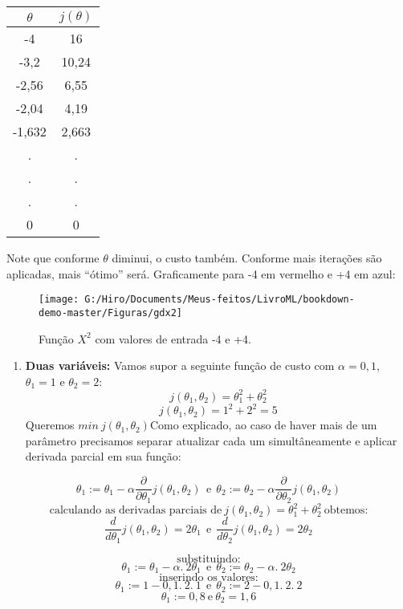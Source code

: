 \documentclass[
  openany]{book}
\providecommand{\tightlist}{%
  \setlength{\itemsep}{0pt}\setlength{\parskip}{0pt}}
\begin{document}
\begin{longtable}[]{@{}cc@{}}
\toprule
\textbf{\(\theta\)} & \textbf{\(j(\theta)\)}\tabularnewline
\midrule
\endhead
-4 & 16\tabularnewline
-3,2 & 10,24\tabularnewline
-2,56 & 6,55\tabularnewline
-2,04 & 4,19\tabularnewline
-1,632 & 2,663\tabularnewline
. & .\tabularnewline
. & .\tabularnewline
. & .\tabularnewline
0 & 0\tabularnewline
\bottomrule
\end{longtable}

Note que conforme \(\theta\) diminui, o custo também. Conforme mais iterações são aplicadas, mais ``ótimo'' será. Graficamente para -4 em vermelho e +4 em azul:

\begin{figure}

{\centering \texttt{[image: G:/Hiro/Documents/Meus-feitos/LivroML/bookdown-demo-master/Figuras/gdx2]} 

}

\caption{Função \(X^2\) com valores de entrada -4 e +4.}\label{fig:gdx2}
\end{figure}



\begin{enumerate}
\def\labelenumi{\arabic{enumi}.}
\setcounter{enumi}{1}
\tightlist
\item
  \textbf{Duas variáveis:} Vamos supor a seguinte função de custo com \(\alpha=0,1\), \(\theta_1=1\) e \(\theta_2=2\):
  \[j(\theta_1,\theta_2)=\theta_1^2+\theta_2^2\]
  \[j(\theta_1,\theta_2)=1^2+2^2=5\]
  Queremos \(min \ j(\theta_1,\theta_2)\)Como explicado, ao caso de haver mais de um parâmetro precisamos separar atualizar cada um simultâneamente e aplicar derivada parcial em sua função:
\end{enumerate}

\[\theta_1:=\theta_1-\alpha \frac{\partial}{\partial\theta_1}j(\theta_1,\theta_2) \ \ \mbox{e}\ \ \theta_2:=\theta_2-\alpha \frac{\partial}{\partial\theta_2}j(\theta_1,\theta_2)\]
\[\mbox{calculando as derivadas parciais de}\ j(\theta_1,\theta_2)=\theta_1^2+\theta_2^2\ \mbox{obtemos:}\]
\[\frac{d}{d\theta_1}j(\theta_1,\theta_2)=2\theta_1 \ \
\mbox{e}\ \ \frac{d}{d\theta_2}j(\theta_1,\theta_2)=2\theta_2\]

\[\mbox{substituindo:}\]
\[\theta_1:=\theta_1-\alpha.\ 2\theta_1 \ \ \mbox{e}\ \ \theta_2:=\theta_2-\alpha .\ 2\theta_2 \]
\[\mbox{inserindo os valores:}\]
\[\theta_1:=1-0,1.\ 2.\ 1 \ \ \mbox{e}\ \ \theta_2:=2-0,1.\ 2.\ 2\]
\[\theta_1:=0,8 \ \mbox{e} \ \theta_2=1,6\]
\end{document}
